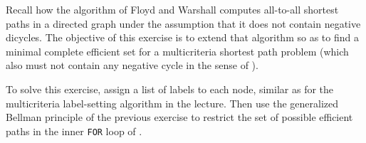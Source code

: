 \documentclass[11pt,a4paper,parskip=half-]{scrartcl}
\begin{document}
\begin{exercise}{}
Recall how the algorithm of Floyd and Warshall computes all-to-all shortest paths in a directed graph under the assumption that it does not contain negative dicycles. The objective of this exercise is to extend that algorithm so as to find a minimal complete efficient set for a multicriteria shortest path problem (which also must not contain any negative cycle in the sense of ).

To solve this exercise, assign a list of labels to each node, similar as for the multicriteria label-setting algorithm in the lecture. Then use the generalized Bellman principle of the previous exercise to restrict the set of possible efficient paths in the inner \texttt{FOR} loop of . 
\end{exercise}
\end{document}
